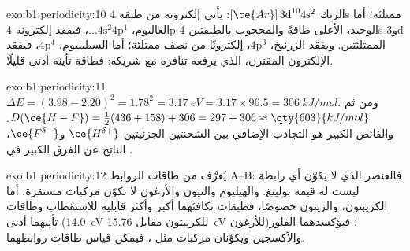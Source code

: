 \begin{solution}{exo:b1:periodicity:10}
الزنك $[\ce{Ar}]\,3\text{d}^{10} 4\text{s}^2$: يأتي إلكترونه من طبقة
4s ممتلئة؛ أما الغاليوم، $\dots 4\text{s}^2 4\text{p}^1$، فيفقد إلكترونه 4p
الوحيد، الأعلى طاقةً والمحجوب بالطبقتين 4s و3d الممتلئتين. ويفقد الزرنيخ،
$4\text{p}^3$، إلكترونًا من  نصف ممتلئة؛ أما السيلينيوم،
$4\text{p}^4$، فيفقد الإلكترون المقترن، الذي يرفعه تنافره مع
شريكه: فطاقة تأينه أدنى قليلًا.
\end{solution}

\begin{solution}{exo:b1:periodicity:11}
$\Delta E = (3.98 - 2.20)^2 = 1.78^2 = \qty{3.17}{eV} = 3.17 \times 96.5 =
\qty{306}{kJ/mol}$. ومن ثم $D(\ce{H-F}) = \tfrac12(436 + 158) + 306 = 297 +
306 \approx \qty{603}{kJ/mol}$. والفائض الكبير هو التجاذب الإضافي
بين الشحنتين الجزئيتين $\ce{H^{\delta+}}$ و$\ce{F^{\delta-}}$، الناتج
عن الفرق الكبير في .
\end{solution}

\begin{solution}{exo:b1:periodicity:12}
يُعرَّف  من طاقات الروابط A--B: فالعنصر
الذي لا يكوّن أي رابطة ليست له قيمة بولينغ. والهيليوم والنيون والأرغون لا تكوّن
مركبات مستقرة. أما الكريبتون، والزينون خصوصًا، فطبقات تكافئهما أكبر وأكثر
قابلية للاستقطاب وطاقات تأينهما أدنى
(\qty{14.0}{eV} للكريبتون مقابل \qty{15.76}{eV} للأرغون)؛ فيؤكسدهما
الفلور والأكسجين ويكوّنان مركبات مثل ، فيمكن قياس
طاقات روابطهما.
\end{solution}

